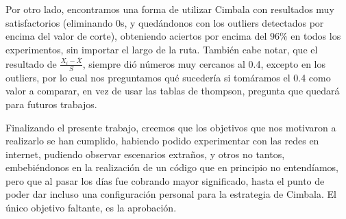 Por otro lado, encontramos una forma de utilizar Cimbala con resultados muy satisfactorios (eliminando 0s, y quedándonos con los outliers detectados por encima del valor de corte), obteniendo aciertos por encima del $96 \%$ en todos los experimentos, sin importar el largo de la ruta. También cabe notar, que el resultado de $\frac{X_i - \bar{X}}{S}$, siempre dió números muy cercanos al 0.4, excepto en los outliers, por lo cual nos preguntamos qué sucedería si tomáramos el 0.4 como valor a comparar, en vez de usar las tablas de thompson, pregunta que quedará para futuros trabajos.

Finalizando el presente trabajo, creemos que los objetivos que nos motivaron a realizarlo se han cumplido, habiendo podido experimentar con las redes en internet, pudiendo observar escenarios extraños, y otros no tantos, embebiéndonos en la realización de un código que en principio no entendíamos, pero que al pasar los días fue cobrando mayor significado, hasta el punto de poder dar incluso una configuración personal para la estrategia de Cimbala. El único objetivo faltante, es la aprobación.


